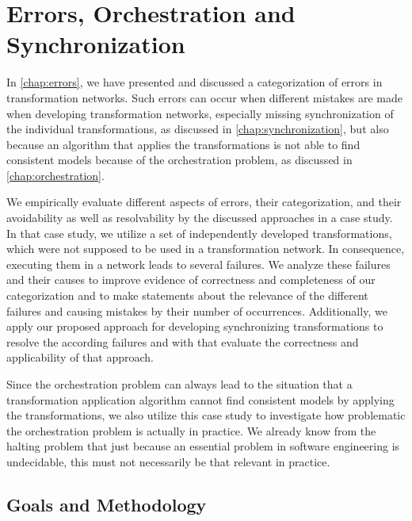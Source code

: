 \section{Errors, Orchestration and Synchronization}
\label{chap:correctness_evaluation:categorization}

In \autoref{chap:errors}, we have presented and discussed a categorization of errors in transformation networks.
Such errors can occur when different mistakes are made when developing transformation networks, especially missing synchronization of the individual transformations, as discussed in \autoref{chap:synchronization}, but also because an algorithm that applies the transformations is not able to find consistent models because of the orchestration problem, as discussed in \autoref{chap:orchestration}.

We empirically evaluate different aspects of errors, their categorization, and their avoidability as well as resolvability by the discussed approaches in a case study.
In that case study, we utilize a set of independently developed transformations, which were not supposed to be used in a transformation network.
In consequence, executing them in a network leads to several failures.
We analyze these failures and their causes to improve evidence of correctness and completeness of our categorization and to make statements about the relevance of the different failures and causing mistakes by their number of occurrences.
Additionally, we apply our proposed approach for developing synchronizing transformations to resolve the according failures and with that evaluate the correctness and applicability of that approach.

Since the orchestration problem can always lead to the situation that a transformation application algorithm cannot find consistent models by applying the transformations, we also utilize this case study to investigate how problematic the orchestration problem is actually in practice.
We already know from the halting problem that just because an essential problem in software engineering is undecidable, this must not necessarily be that relevant in practice.


\subsection{Goals and Methodology}

